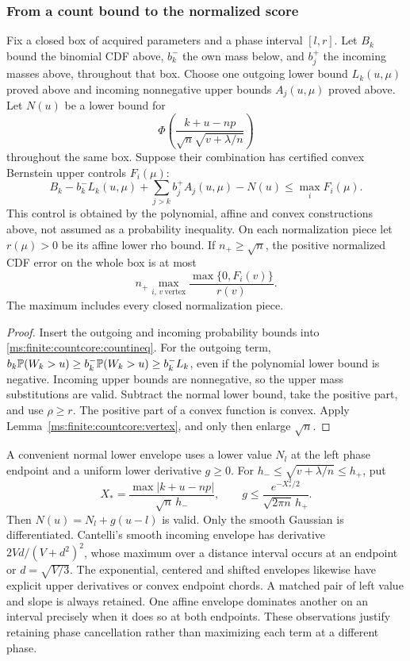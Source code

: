 \subsubsection{From a count bound to the normalized score}

\begin{theorem}
\label{ms:finite:countcore:scoretheorem}
Fix a closed box of acquired parameters and a phase interval \([l,r]\).
Let \(B_k\) bound the binomial CDF above, \(b_k^-\) the own mass
below, and \(b_j^+\) the incoming masses above, throughout that box.
Choose one outgoing lower bound \(L_k(u,\mu)\) proved above and
incoming nonnegative upper bounds \(A_j(u,\mu)\) proved above.
Let \(N(u)\) be a lower bound for
\[
 \Phi\left(\frac{k+u-np}{\sqrt n\sqrt{v+\lambda/n}}\right)
\]
throughout the same box. Suppose their combination has certified convex
Bernstein upper controls \(F_i(\mu)\):
\[
 B_k-b_k^-L_k(u,\mu)+\sum_{j>k}b_j^+A_j(u,\mu)-N(u)
 \le\max_i F_i(\mu).
\]
This control is obtained by the polynomial, affine and convex constructions
above, not assumed as a probability inequality. On each normalization
piece let \(r(\mu)>0\) be its affine lower rho bound. If \(n_+\ge\sqrt n\),
the positive normalized CDF error on the whole box is at most
\begin{equation}
 n_+\max_{i,\,v\ \mathrm{vertex}}
                  \frac{\max\{0,F_i(v)\}}{r(v)}.
 \label{ms:finite:countcore:scorebound}
\end{equation}
The maximum includes every closed normalization piece.
\end{theorem}
\begin{proof}
Insert the outgoing and incoming probability bounds into
\eqref{ms:finite:countcore:countineq}. For the outgoing term,
\(b_k\mathbb P(W_k>u)\ge b_k^-\mathbb P(W_k>u)\ge b_k^-L_k\),
even if the polynomial lower bound is negative. Incoming upper bounds
are nonnegative, so the upper mass substitutions are valid. Subtract
the normal lower bound, take the positive part, and use \(\rho\ge r\).
The positive part of a convex function is convex. Apply
Lemma~\ref{ms:finite:countcore:vertex}, and only then enlarge \(\sqrt n\).
\end{proof}

A convenient normal lower envelope uses a lower value \(N_l\) at the
left phase endpoint and a uniform lower derivative \(g\ge0\).
For \(h_-\le\sqrt{v+\lambda/n}\le h_+\), put
\[
 X_*=\frac{\max|k+u-np|}{\sqrt n\,h_-},\qquad
 g\le\frac{e^{-X_*^2/2}}{\sqrt{2\pi n}\,h_+}.
\]
Then \(N(u)=N_l+g(u-l)\) is valid. Only the smooth Gaussian is
differentiated. Cantelli's smooth incoming envelope has derivative
\(2Vd/(V+d^2)^2\), whose maximum over a distance interval occurs at
an endpoint or \(d=\sqrt{V/3}\). The exponential, centered and shifted
envelopes likewise have explicit upper derivatives or convex endpoint
chords. A matched pair of left value and slope is always retained.
One affine envelope dominates another on an interval precisely when it
does so at both endpoints. These observations justify retaining phase
cancellation rather than maximizing each term at a different phase.

